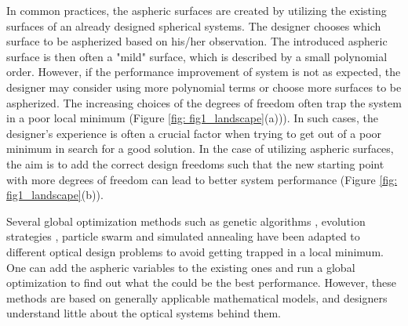 In common practices, the aspheric surfaces are created by utilizing the existing surfaces of an already designed spherical systems. The designer chooses which surface to be aspherized based on his/her observation. The introduced aspheric surface is then often a "mild" surface, which is described by a small polynomial order. However, if the performance improvement of system is not as expected, the designer may consider using more polynomial terms or choose more surfaces to be aspherized. The increasing choices of the degrees of freedom often trap the system in a poor local minimum (Figure \ref{fig: fig1_landscape}(a))). In such cases, the designer's experience is often a crucial factor when trying to get out of a poor minimum in search for a good solution. In the case of utilizing aspheric surfaces, the aim is to add the correct design freedoms such that the new starting point with more degrees of freedom can lead to better system performance (Figure \ref{fig: fig1_landscape}(b)). %


Several global optimization methods such as genetic algorithms \cite{Moore1999}, evolution strategies \cite{Nagar:18}, particle swarm \cite{MenkeParticleSwarm} and simulated annealing \cite{Forbes1991} have been adapted to different optical design problems to avoid getting trapped in a local minimum. One can add the aspheric variables to the existing ones and run a global optimization to find out what the could be the best performance. However, these methods are based on generally applicable mathematical models, and designers understand little about the optical systems behind them. 
 
